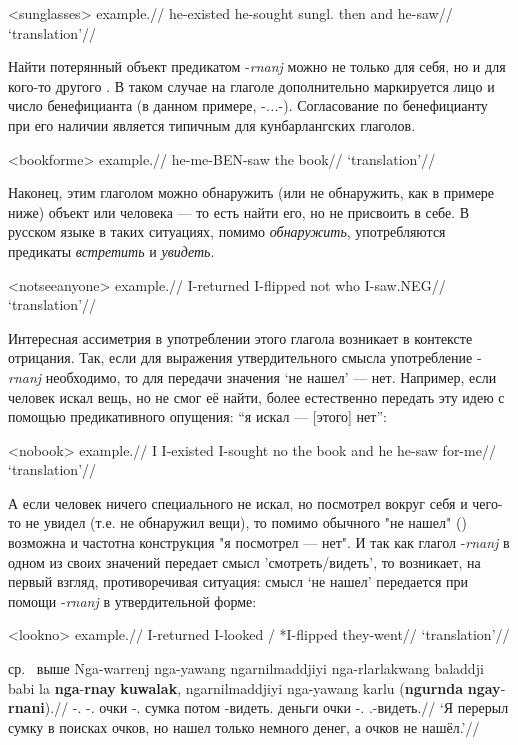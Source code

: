 \ex<sunglasses>\begingl
\gla example.//
\glb he-existed he-sought sungl. then and he-saw//
\glft `translation'//
\endgl\xe

Найти потерянный объект предикатом -\textit{rnanj} можно не только для себя, но и для кого-то другого . В таком случае на глаголе дополнительно маркируется лицо и число бенефицианта (в данном примере, -\textit{...}-). Согласование по бенефицианту при его наличии является типичным для кунбарлангских глаголов. 

\ex<bookforme>\begingl
\gla example.//
\glb he-me-BEN-saw the book//
\glft `translation'//
\endgl\xe

Наконец, этим глаголом можно обнаружить (или не обнаружить, как в примере ниже) объект или человека --- то есть найти его, но не присвоить в себе. В русском языке в таких ситуациях, помимо \textit{обнаружить}, употребляются предикаты \textit{встретить} и \textit{увидеть}.

\ex<notseeanyone>\begingl
\gla example.//
\glb  I-returned I-flipped not who I-saw.NEG//
\glft `translation'//
\endgl\xe

Интересная ассиметрия в употреблении этого глагола возникает в контексте отрицания. Так, если для выражения утвердительного смысла употребление -\textit{rnanj} необходимо, то для передачи значения `не нашел' --- нет. Например, если человек искал вещь, но не смог её найти, более естественно передать эту идею
с помощью предикативного опущения: ``я искал --- [этого] нет'':

\ex<nobook>\begingl
\gla example.//
\glb I I-existed I-sought no the book and he he-saw for-me//
\glft `translation'//
\endgl\xe

А если человек ничего специального не искал, но посмотрел вокруг себя и чего-то не увидел (т.е. не обнаружил вещи), то помимо обычного "не нашел" () возможна и частотна конструкция "я посмотрел --- нет". И так как глагол -\textit{rnanj} в одном из своих значений передает смысл 'смотреть/видеть', то возникает, на первый взгляд, противоречивая ситуация: смысл `не нашел' передается при помощи -\textit{rnanj} в утвердительной форме:

\ex<lookno>\begingl
\gla example.//
\glb I-returned {I-looked / *I-flipped} they-went//
\glft `translation'//
\endgl\xe



ср.\  выше
\begingl
\gla Nga-warrenj nga-yawang ngarnilmaddjiyi nga-rlarlakwang baladdji babi la \textbf{nga}-\textbf{rnay} \textbf{kuwalak}, ngarnilmaddjiyi nga-yawang karlu (\textbf{ngurnda} \textbf{ngay}-\textbf{rnani}).//
\glb \nga-\warre.\Pst{} \nga-\yaw.\Pst{} очки \nga-\rlk.\Pst{} сумка потом \la{} \nga-видеть.\Pst{} деньги очки \nga-\yaw.\Pst{} \karlu{} \phantom{(}\Neg{} \Fsg.\irrpst-видеть.\irrpst{}//
\glft `Я перерыл сумку в поисках очков, но нашел только немного денег, а очков не нашёл.'//%
\endgl\xe

